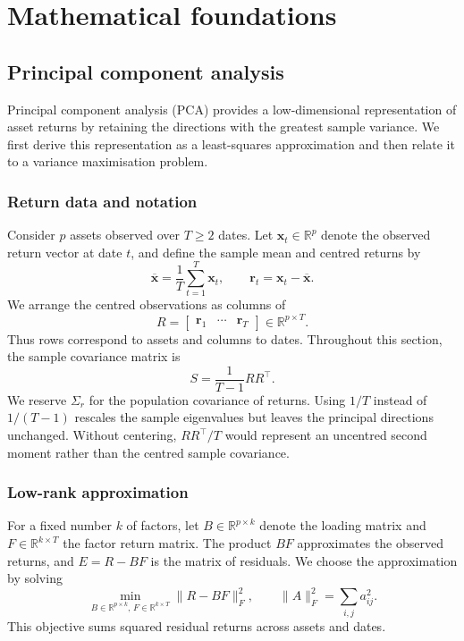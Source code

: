 \chapter{Mathematical foundations}

\section{Principal component analysis}
\label{sec:pca}

Principal component analysis (PCA) provides a low-dimensional representation
of asset returns by retaining the directions with the greatest sample variance.
We first derive this representation as a least-squares approximation and then
relate it to a variance maximisation problem.

\subsection{Return data and notation}

Consider $p$ assets observed over $T\geq 2$ dates. Let
$\mathbf{x}_t\in\mathbb{R}^p$ denote the observed return vector at date $t$,
and define the sample mean and centred returns by
\[
  \overline{\mathbf{x}}=\frac{1}{T}\sum_{t=1}^T\mathbf{x}_t,
  \qquad
  \mathbf{r}_t=\mathbf{x}_t-\overline{\mathbf{x}}.
\]
We arrange the centred observations as columns of
\[
  R=\begin{bmatrix}\mathbf{r}_1&\cdots&\mathbf{r}_T\end{bmatrix}
  \in\mathbb{R}^{p\times T}.
\]
Thus rows correspond to assets and columns to dates. Throughout this section,
the sample covariance matrix is
\begin{equation}
  \label{eq:sample-covariance}
  S=\frac{1}{T-1}RR^\top.
\end{equation}
We reserve $\Sigma_r$ for the population covariance of returns. Using $1/T$
instead of $1/(T-1)$ rescales the sample eigenvalues but leaves the principal
directions unchanged. Without centering, $RR^\top/T$ would represent an
uncentred second moment rather than the centred sample covariance.

\subsection{Low-rank approximation}

For a fixed number $k$ of factors, let $B\in\mathbb{R}^{p\times k}$ denote
the loading matrix and $F\in\mathbb{R}^{k\times T}$ the factor return matrix.
The product $BF$ approximates the observed returns, and
$E=R-BF$ is the matrix of residuals. We choose the approximation by solving
\begin{equation}
  \label{eq:min_unexplained_variance}
  \min_{B\in\mathbb{R}^{p\times k},\,F\in\mathbb{R}^{k\times T}}
       \lVert R-BF\rVert_F^2,
  \qquad
  \lVert A\rVert_F^2=\sum_{i,j}a_{ij}^2.
\end{equation}
This objective sums squared residual returns across assets and dates.

